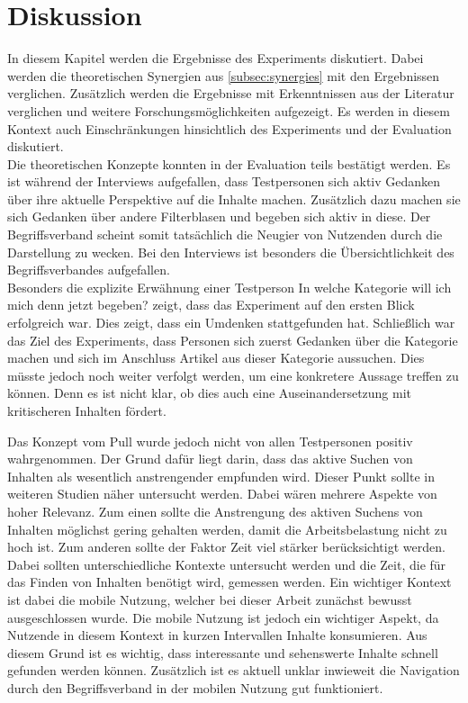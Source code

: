 \section{Diskussion}\label{sec:discussion}
In diesem Kapitel werden die Ergebnisse des Experiments diskutiert.
Dabei werden die theoretischen Synergien aus \autoref{subsec:synergies} mit den Ergebnissen verglichen.
Zusätzlich werden die Ergebnisse mit Erkenntnissen aus der Literatur verglichen und weitere Forschungsmöglichkeiten aufgezeigt.
Es werden in diesem Kontext auch Einschränkungen hinsichtlich des Experiments und der Evaluation diskutiert.\\

Die theoretischen Konzepte konnten in der Evaluation teils bestätigt werden.
Es ist während der Interviews aufgefallen, dass Testpersonen sich aktiv Gedanken über ihre aktuelle Perspektive auf die Inhalte machen.
Zusätzlich dazu machen sie sich Gedanken über andere Filterblasen und begeben sich aktiv in diese.
Der Begriffsverband scheint somit tatsächlich die Neugier von Nutzenden durch die Darstellung zu wecken.
Bei den Interviews ist besonders die Übersichtlichkeit des Begriffsverbandes aufgefallen. \\

Besonders die explizite Erwähnung einer Testperson \glqq In welche Kategorie will ich mich denn jetzt begeben?\grqq{} zeigt, dass das Experiment auf den ersten Blick erfolgreich war.
Dies zeigt, dass ein Umdenken stattgefunden hat.
Schließlich war das Ziel des Experiments, dass Personen sich zuerst Gedanken über die Kategorie machen und sich im Anschluss Artikel aus dieser Kategorie aussuchen.
Dies müsste jedoch noch weiter verfolgt werden, um eine konkretere Aussage treffen zu können.
Denn es ist nicht klar, ob dies auch eine Auseinandersetzung mit kritischeren Inhalten fördert.

Das Konzept vom Pull wurde jedoch nicht von allen Testpersonen positiv wahrgenommen.
Der Grund dafür liegt darin, dass das aktive Suchen von Inhalten als wesentlich anstrengender empfunden wird.
Dieser Punkt sollte in weiteren Studien näher untersucht werden.
Dabei wären mehrere Aspekte von hoher Relevanz.
Zum einen sollte die Anstrengung des aktiven Suchens von Inhalten möglichst gering gehalten werden, damit die Arbeitsbelastung nicht zu hoch ist.
Zum anderen sollte der Faktor Zeit viel stärker berücksichtigt werden.
Dabei sollten unterschiedliche Kontexte untersucht werden und die Zeit, die für das Finden von Inhalten benötigt wird, gemessen werden.
Ein wichtiger Kontext ist dabei die mobile Nutzung, welcher bei dieser Arbeit zunächst bewusst ausgeschlossen wurde.
Die mobile Nutzung ist jedoch ein wichtiger Aspekt, da Nutzende in diesem Kontext in kurzen Intervallen Inhalte konsumieren.
Aus diesem Grund ist es wichtig, dass interessante und sehenswerte Inhalte schnell gefunden werden können.
Zusätzlich ist es aktuell unklar inwieweit die Navigation durch den Begriffsverband in der mobilen Nutzung gut funktioniert.\\

